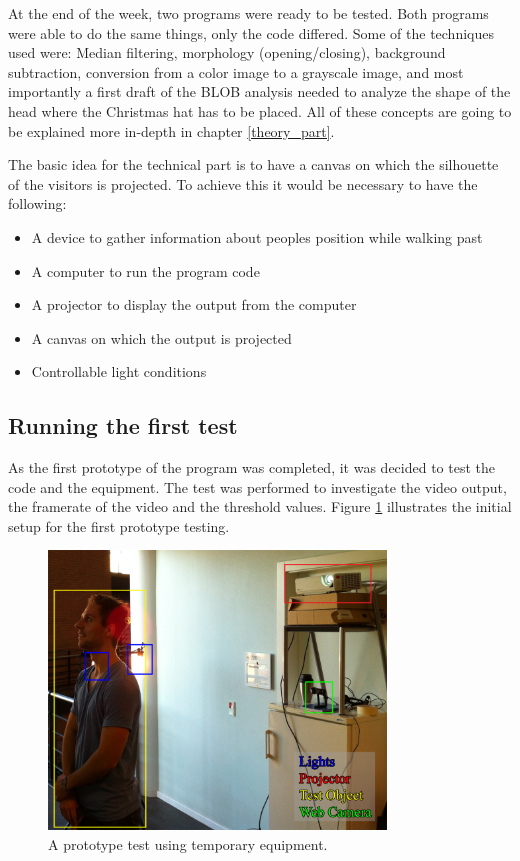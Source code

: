 At the end of the week, two programs were ready to be tested. Both programs were able to do the same things, only the code differed. Some of the techniques used were: Median filtering, morphology (opening/closing), background subtraction, conversion from a color image to a grayscale image, and most importantly a first draft of the BLOB analysis needed to analyze the shape of the head where the Christmas hat has to be placed. All of these concepts are going to be explained more in-depth in chapter \ref{theory_part}.

The basic idea for the technical part is to have a canvas on which the silhouette of the visitors is projected. To achieve this it would be necessary to have the following:


\begin{itemize}
\item A device to gather information about peoples position while walking past
\item A computer to run the program code
\item A projector to display the output from the computer
\item A canvas on which the output is projected
\item Controllable light conditions
\end{itemize}

\subsection{Running the first test}
As the first prototype of the program was completed, it was decided to test the code and the  equipment. The test was performed to investigate the video output, the framerate of the video and the threshold values. Figure \ref{fig:ir_cam_test} illustrates the initial setup for the first prototype testing.

\begin{figure}[htbp]
\centering
\includegraphics[width=0.80\textwidth]{Pictures/Test/TestSetup.jpg}
\caption{A prototype test using temporary equipment.}
\label{fig:ir_cam_test}
\end{figure} 

